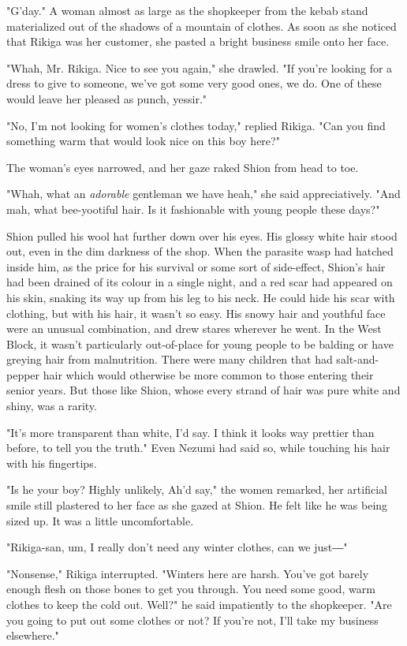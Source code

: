 "G'day." A woman almost as large as the shopkeeper from the kebab stand
materialized out of the shadows of a mountain of clothes. As soon as she
noticed that Rikiga was her customer, she pasted a bright business smile
onto her face.

"Whah, Mr. Rikiga. Nice to see you again," she drawled. "If you're
looking for a dress to give to someone, we've got some very good ones,
we do. One of these would leave her pleased as punch, yessir."

"No, I'm not looking for women's clothes today," replied Rikiga. "Can
you find something warm that would look nice on this boy here?"

The woman's eyes narrowed, and her gaze raked Shion from head to toe.

"Whah, what an \emph{adorable} gentleman we have heah," she said
appreciatively. "And mah, what bee-yootiful hair. Is it fashionable with
young people these days?"

Shion pulled his wool hat further down over his eyes. His glossy white
hair stood out, even in the dim darkness of the shop. When the parasite
wasp had hatched inside him, as the price for his survival or some sort
of side-effect, Shion's hair had been drained of its colour in a single
night, and a red scar had appeared on his skin, snaking its way up from
his leg to his neck. He could hide his scar with clothing, but with his
hair, it wasn't so easy. His snowy hair and youthful face were an
unusual combination, and drew stares wherever he went. In the West
Block, it wasn't particularly out-of-place for young people to be
balding or have greying hair from malnutrition. There were many children
that had salt-and-pepper hair which would otherwise be more common to
those entering their senior years. But those like Shion, whose every
strand of hair was pure white and shiny, was a rarity.

"It's more transparent than white, I'd say. I think it looks way
prettier than before, to tell you the truth." Even Nezumi had said so,
while touching his hair with his fingertips.

"Is he your boy? Highly unlikely, Ah'd say," the women remarked, her
artificial smile still plastered to her face as she gazed at Shion. He
felt like he was being sized up. It was a little uncomfortable.

"Rikiga-san, um, I really don't need any winter clothes, can we just―"

"Nonsense," Rikiga interrupted. "Winters here are harsh. You've got
barely enough flesh on those bones to get you through. You need some
good, warm clothes to keep the cold out. Well?" he said impatiently to
the shopkeeper. "Are you going to put out some clothes or not? If you're
not, I'll take my business elsewhere."

